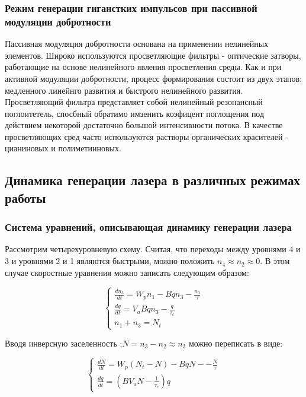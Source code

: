 \documentclass[a4paper]{article}
\begin{document}
\subsubsection{Режим генерации гиганстких импульсов при пассивной модуляции добротности} %

Пассивная модуляция добротности основана на применении нелинейных элементов. Широко используются просветляющие фильтры - оптические затворы, работающие на основе нелинейного явления просветления среды. Как и при активной модуляции добротности, процесс формирования состоит из двух этапов: медленного линейнго развития и быстрого нелинейного развития. Просветляющий фильтра представляет собой нелинейный резонансный поглоитетель, спосбный обратимо имзенить коэфицент поглощения под действием некоторой достаточно большой интенсивности потока. В качестве просветляющих сред часто используются растворы органических красителей - цианиновых и полиметинновых.

\subsection{Динамика генерации лазера в различных режимах работы} %
\label{sub:динамика_генерации_лазера_в_различных_режимах_работы}

\subsubsection{Система уравнений, описывающая динамику генерации лазера}

Рассмотрим четырехуровневую схему. Считая, что переходы между уровнями 4 и 3 и уровнями 2 и 1 являются быстрыми, можно положить $n_4 \approx n_2 \approx 0$. В этом случае скоростные уравнения можно записать следующим образом:

\begin{equation}
\begin{cases}
\frac{dn_3}{dt} = W_pn_1 - Bqn_3 - \frac{n_3}{\tau} \\
\frac{dq}{dt} = V_a Bqn_3 - \frac{q}{\tau_c} \\
n_1 + n_3 = N_t
\end{cases}
\end{equation}

Вводя инверсную заселенность ;$N = n_3 - n_2 \approx n_3$ можно переписать в виде:

\begin{equation}
\begin{cases}
\label{main_cases}
\frac{dN}{dt} = W_p(N_t - N) - BqN -- \frac{N}{\tau} \\
\frac{dq}{dt} = (BV_aN - \frac{1}{\tau_c})q
\end{cases}
\end{equation}
\end{document}
